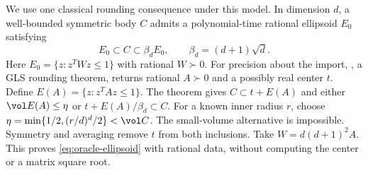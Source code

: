 We use one classical rounding consequence under this model. In dimension
$d$, a well-bounded symmetric body $C$ admits a polynomial-time rational
ellipsoid $E_0$ satisfying
\begin{equation}\label{eq:oracle-ellipsoid}
 E_0\subset C\subset\beta_dE_0,\qquad
 \beta_d=(d+1)\sqrt d.
\end{equation}
Here $E_0=\{z:z^TWz\le1\}$ with rational $W\succ0$. For precision
about the import, \citet[Theorem B.5]{dpv2011}, a GLS rounding theorem,
returns rational $A\succ0$ and a possibly real center $t$. Define
$E(A)=\{z:z^TAz\le1\}$. The theorem gives
$C\subset t+E(A)$ and either $\vol E(A)\le\eta$ or
$t+E(A)/\beta_d\subset C$. For a known inner radius $r$, choose
$\eta=\min\{1/2,(r/d)^d/2\}<\vol C$. The small-volume alternative is
impossible. Symmetry and averaging remove $t$ from both inclusions.
Take $W=d(d+1)^2A$. This proves \eqref{eq:oracle-ellipsoid} with rational
data, without computing the center or a matrix square root.

